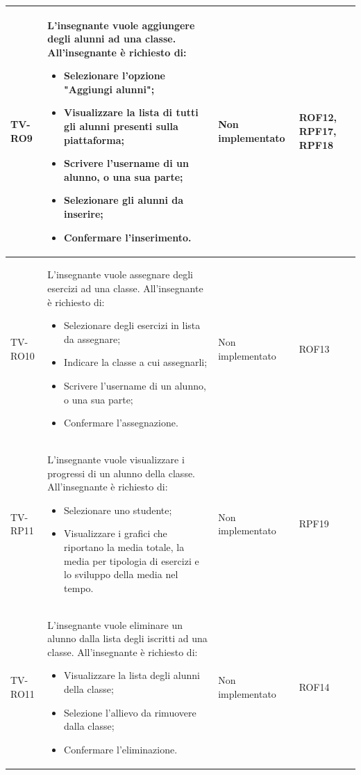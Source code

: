 \begin{longtable}{|>{\centering\arraybackslash}m{1.6cm}|>{\centering\arraybackslash}m{6.41cm}|>{\centering\arraybackslash}m{3.1cm} | >{\centering\arraybackslash}m{2.6cm}|}
TV-RO9 & L'insegnante vuole aggiungere degli alunni ad una classe. All'insegnante è richiesto di:
\begin{itemize}
 \item Selezionare l'opzione "Aggiungi alunni";
 \item Visualizzare la lista di tutti gli alunni presenti sulla piattaforma;
 \item Scrivere l'username di un alunno, o una sua parte;
 \item Selezionare gli alunni da inserire;
 \item Confermare l'inserimento.
\end{itemize}& Non implementato  & ROF12, RPF17, RPF18 \\ \hline

		  \rowcolor{LightGray}
TV-RO10 & L'insegnante vuole assegnare degli esercizi ad una classe. All'insegnante è richiesto di:
\begin{itemize}
 \item Selezionare degli esercizi in lista da assegnare;
 \item Indicare la classe a cui assegnarli;
 \item Scrivere l'username di un alunno, o una sua parte;
 \item Confermare l'assegnazione.
\end{itemize} & Non implementato & ROF13 \\ \hline

TV-RP11 & L'insegnante vuole visualizzare i progressi di un alunno della classe. All'insegnante è richiesto di:
\begin{itemize}
 \item Selezionare uno studente;
 \item Visualizzare i grafici che riportano la media totale, la media per tipologia di
 esercizi e lo sviluppo della media nel tempo.
\end{itemize} & Non implementato & RPF19 \\ \hline
		
		  \rowcolor{LightGray}
	TV-RO11 & L'insegnante vuole eliminare un alunno dalla lista degli iscritti ad una classe. All'insegnante è richiesto di:
		\begin{itemize}
			\item Visualizzare la lista degli alunni della classe;
			\item Selezione l'allievo da rimuovere dalla classe;
			\item Confermare l'eliminazione.		
		\end{itemize} & Non implementato & ROF14 \\ \hline	
		

\end{longtable}
